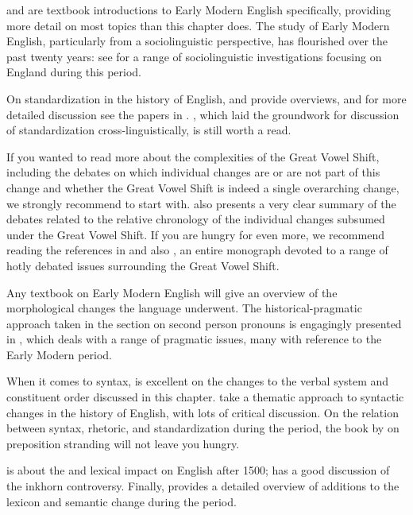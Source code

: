 \largerpage
\begin{furtherreading}
\citet{Barber1997} and \citet{Nevalainen2006} are textbook introductions to Early Modern English specifically, providing more detail on most topics than this chapter does. The study of Early Modern English, particularly from a sociolinguistic perspective, has flourished over the past twenty years: see \citet{NevalainenRaumolinBrunberg2016} for a range of sociolinguistic investigations focusing on England during this period.

On standardization in the history of English, \citet[Chapter 3]{Millar2012} and \citet{Tieken2017} provide overviews, and for more detailed discussion see the papers in \citet{Wright2000}. \citet{Haugen1966}, which laid the groundwork for discussion of standardization cross-linguistically, is still worth a read.

If you wanted to read more about the complexities of the Great Vowel Shift, including the debates on which individual changes are or are not part of this change and whether the Great Vowel Shift is indeed a single overarching change, we strongly recommend \citet{McMahon2006} to start with. \citet{McMahon2006} also presents a very clear summary of the debates related to the relative chronology of the individual changes subsumed under the Great Vowel Shift. If you are hungry for even more, we recommend reading the references in \citet{McMahon2006} and also \citet{Stenbrenden2016}, an entire monograph devoted to a range of hotly debated issues surrounding the Great Vowel Shift.

Any textbook on Early Modern English will give an overview of the morphological changes the language underwent. The historical-pragmatic approach taken in the section on second person pronouns is engagingly presented in \citet{JuckerTaavitsainen2013}, which deals with a range of pragmatic issues, many with reference to the Early Modern period.

When it comes to syntax, \citet[Chapter 4]{Los2015} is excellent on the changes to the verbal system and constituent order discussed in this chapter. \citet{FischerDeSmetvanderWurff2017} take a thematic approach to syntactic changes in the history of English, with lots of critical discussion. On the relation between syntax, rhetoric, and standardization during the period, the book by \citet{YanezBouza2015} on preposition stranding will not leave you hungry.

\citet[Chapter 14]{Durkin2014} is about the  and  lexical impact on English after 1500; \citet{Barber1997} has a good discussion of the inkhorn controversy. Finally, \citet{Nevalainen1999} provides a detailed overview of additions to the lexicon and semantic change during the period.
\end{furtherreading}
